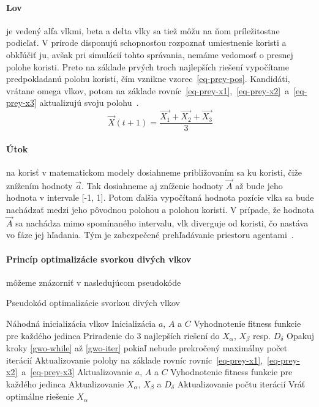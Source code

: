\documentclass[a4paper,slovak,12pt,appendix]{article}
\begin{document}
\paragraph{Lov} je vedený alfa vlkmi, beta a delta vlky sa tiež môžu na ňom
príležitostne podieľať. V prírode disponujú schopnosťou rozpoznať
umiestnenie koristi a obkľúčiť ju, avšak pri simulácií tohto správania, nemáme
vedomosť o presnej polohe koristi. Preto na základe prvých troch najlepších
riešení vypočítame predpokladanú polohu koristi, čím vznikne
vzorec~\ref{eq-prey-pos}. Kandidáti, vrátane omega vlkov, potom na základe
rovníc~\ref{eq-prey-x1},~\ref{eq-prey-x2}~a~\ref{eq-prey-x3} aktualizujú svoju
polohu~\cite{Seeley1991}.
\begin{equation}
  \vec{X}(t+1) = \frac{\vec{X_1} + \vec{X_2} + \vec{X_3}}{3}
  \label{eq-prey-pos}
\end{equation}

\paragraph{Útok} na korisť v matematickom modely dosiahneme približovaním sa ku
koristi, čiže znížením hodnoty $\vec{a}$. Tak dosiahneme aj zníženie hodnoty
$\vec{A}$ až bude jeho hodnota v intervale [-1, 1]. Potom ďalšia vypočítaná
hodnota pozície vlka sa bude nachádzať medzi jeho pôvodnou polohou a polohou
koristi. V prípade, že hodnota $\vec{A}$ sa nachádza mimo spomínaného
intervalu, vlk diverguje od koristi, čo nastáva vo fáze jej hľadania. Tým
je zabezpečené prehľadávanie priestoru agentami~\cite{Seeley1991}.

\paragraph{Princíp optimalizácie svorkou divých vlkov} môžeme znázorniť
v nasledujúcom pseudokóde~\cite{Seeley1991}
\begin{algorithm}[H]
  \caption{Pseudokód optimalizácie svorkou divých vlkov}
  \begin{algorithmic}[1]
    \State Náhodná inicializácia vlkov
    \State Inicializácia $a$, $A$ a $C$
    \State Vyhodnotenie fitness funkcie pre každého jedinca
    \State Priradenie do 3 najlepších riešení do $X_\alpha$, $X_\beta$ resp. $D_\delta$
    \State Opakuj kroky \ref{gwo-while} až \ref{gwo-iter} pokiaľ nebude prekročený maximálny počet iterácií \label{gwo-while}
    \State Aktualizovanie polohy na základe rovníc rovníc~\ref{eq-prey-x1},~\ref{eq-prey-x2}~a~\ref{eq-prey-x3}
    \State Aktualizovanie $a$, $A$ a $C$
    \State Vyhodnotenie fitness funkcie pre každého jedinca
    \State Aktualizovanie $X_\alpha$, $X_\beta$ a $D_\delta$
    \State Aktualizovanie počtu iterácií \label{gwo-iter}
    \State Vráť optimálne riešenie $X_\alpha$
  \end{algorithmic}
\end{algorithm}
\end{document}
